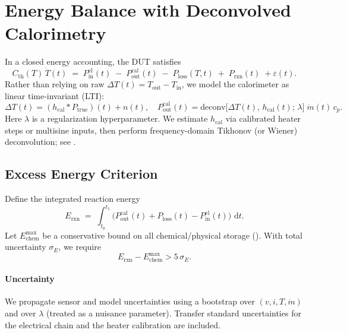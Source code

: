\documentclass[11pt]{article}
\theoremstyle{remark}
\newcommand{\dd}{\,\mathrm{d}}
\begin{document}
\section{Energy Balance with Deconvolved Calorimetry}
\label{sec:energy}
In a closed energy accounting, the DUT satisfies
\begin{equation}
C_{\mathrm{th}}(T)\,\dot T(t) \;=\; P_{\mathrm{in}}^{\mathrm{el}}(t) \; - \; P_{\mathrm{out}}^{\mathrm{cal}}(t) \; - \; P_{\mathrm{loss}}(T,t) \; + \; P_{\mathrm{rxn}}(t) \; + \varepsilon(t).
\label{eq:balance}
\end{equation}
Rather than relying on raw $\Delta T(t)=T_{\mathrm{out}}-T_{\mathrm{in}}$, we model the calorimeter as linear time-invariant (LTI):
\begin{equation}
\Delta T(t) = (h_{\mathrm{cal}} * P_{\mathrm{true}})(t) + n(t), \quad P_{\mathrm{out}}^{\mathrm{cal}}(t) = \mathrm{deconv}\big[\Delta T(t),\,h_{\mathrm{cal}}(t);\,\lambda\big]\;\dot{m}(t)\,c_p.
\end{equation}
Here $\lambda$ is a regularization hyperparameter. We estimate $h_{\mathrm{cal}}$ via calibrated heater steps or multisine inputs, then perform frequency-domain Tikhonov (or Wiener) deconvolution; see .

\subsection{Excess Energy Criterion}
Define the integrated reaction energy
\begin{equation}
E_{\mathrm{rxn}}\;=\;\int_{t_0}^{t_1}\!\Big(P_{\mathrm{out}}^{\mathrm{cal}}(t) + P_{\mathrm{loss}}(t) - P_{\mathrm{in}}^{\mathrm{el}}(t)\Big)\,\dd t.
\end{equation}
Let $E_{\mathrm{chem}}^{\max}$ be a conservative bound on all chemical/physical storage (). With total uncertainty $\sigma_E$, we require
\begin{equation}
E_{\mathrm{rxn}} - E_{\mathrm{chem}}^{\max} > 5\,\sigma_E.
\label{eq:gate}
\end{equation}
\paragraph{Uncertainty} We propagate sensor and model uncertainties using a bootstrap over $(v,i,T,\dot m)$ and over $\lambda$ (treated as a nuisance parameter). Transfer standard uncertainties for the electrical chain and the heater calibration are included.
\end{document}
